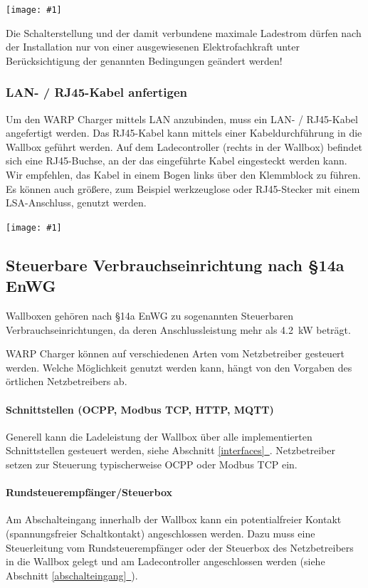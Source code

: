 \documentclass[a4paper,10pt]{article}
\newcommand{\hint}[1]{\begin{tcolorbox}[colback=boxgray,colframe=black,coltext=
white,title=Hinweis,left*=2mm,right*=2mm,boxsep=1mm,bottom=1mm,top=1mm]#1\end{tcolorbox}}
\newcommand{\gfx}[1]{\texttt{[image: \#1]}}
\newcommand*{\fullref}[1]{Abschnitt \hyperref[{#1}]{\ref*{#1}~\nameref*{#1}}}
\begin{document}
\begin{multicols*}{2}
    \gfx{./img_warp3/resized/warp3_switches.jpg}

    \hint{Die Schalterstellung und der damit verbundene maximale Ladestrom dürfen nach der
          Installation nur von einer ausgewiesenen Elektrofachkraft unter
          Berücksichtigung der genannten Bedingungen geändert werden!}

    \subsubsection{LAN- / RJ45-Kabel anfertigen}\label{ethernet}

    Um den WARP Charger mittels LAN anzubinden, muss ein LAN- / RJ45-Kabel
    angefertigt werden. Das RJ45-Kabel kann mittels einer
    Kabeldurchführung in die Wallbox geführt werden. Auf dem Ladecontroller
	(rechts in der Wallbox) befindet sich eine RJ45-Buchse, an der das
	eingeführte Kabel eingesteckt werden kann. Wir empfehlen, das Kabel
	in einem Bogen links über den Klemmblock zu führen.
	Es können auch größere, zum Beispiel werkzeuglose oder RJ45-Stecker
	mit einem LSA-Anschluss, genutzt werden.

    \gfx{./img_warp3/resized/warp3_pro_open_highlighted_LAN.jpg} %

    \subsection{Steuerbare Verbrauchseinrichtung nach \S14a EnWG}\label{s14enwg}
    Wallboxen gehören nach \S14a EnWG zu sogenannten Steuerbaren
    Verbrauchseinrichtungen, da deren Anschlussleistung mehr als \SI{4,2}{\kilo\watt} beträgt.

    WARP Charger können auf verschiedenen Arten vom Netzbetreiber gesteuert werden.
    Welche Möglichkeit genutzt werden kann, hängt von den Vorgaben des örtlichen Netzbetreibers ab.

    \paragraph*{Schnittstellen (OCPP, Modbus TCP, HTTP, MQTT)}
    Generell kann die Ladeleistung der Wallbox über alle implementierten Schnittstellen gesteuert werden, siehe \fullref{interfaces}.
    Netzbetreiber setzen zur Steuerung typischerweise OCPP oder Modbus TCP ein.

    \paragraph*{Rundsteuerempfänger/Steuerbox}
    Am Abschalteingang innerhalb der Wallbox kann ein potentialfreier Kontakt (spannungsfreier Schaltkontakt)
    angeschlossen werden. Dazu muss eine Steuerleitung vom Rundsteuerempfänger
    oder der Steuerbox des Netzbetreibers in die Wallbox gelegt und am
	Ladecontroller angeschlossen werden (siehe \fullref{abschalteingang}).


\end{multicols*}
\end{document}
